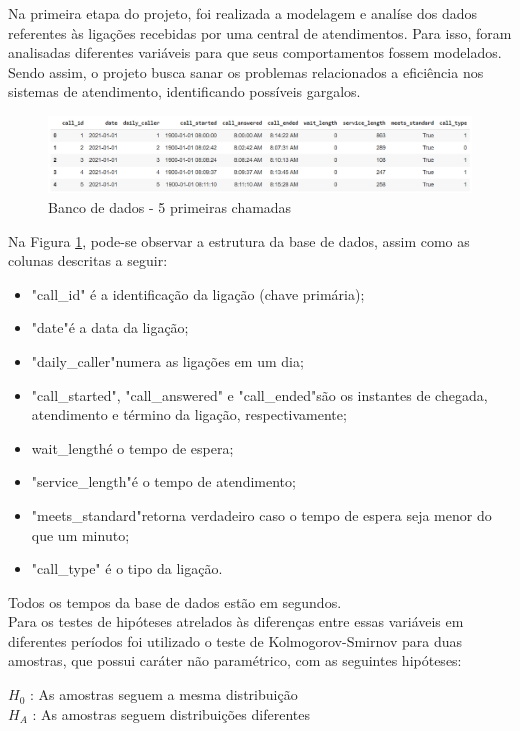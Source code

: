 Na primeira etapa do projeto, foi realizada a modelagem e analíse dos dados referentes às ligações recebidas por uma central de atendimentos. Para isso, foram analisadas diferentes variáveis para que seus comportamentos fossem modelados. Sendo assim, o projeto busca sanar os problemas relacionados a eficiência nos sistemas de atendimento, identificando possíveis gargalos.

\begin{figure}[H]
    \includegraphics[scale= 0.6]{analise-de-dados/intro-analise/imgintro.png}
    \caption{Banco de dados - 5 primeiras chamadas}
    \label{fig: bd_img}
\end{figure}

Na Figura \ref*{fig: bd_img}, pode-se observar a estrutura da base de dados, assim como as colunas descritas a seguir:

\begin{itemize} 
    \item"call\_id" é a identificação da ligação (chave primária);
    \item"date"\;é a data da ligação;
    \item "daily\_caller"\;numera as ligações em um dia;
    \item"call\_started", "call\_answered" e "call\_ended"\;são os instantes de chegada, atendimento e término  da ligação, respectivamente;
    \item wait\_length\;é o tempo de espera;
    \item"service\_length"\;é o tempo de atendimento;
    \item"meets\_standard"\;retorna verdadeiro caso o tempo de espera seja menor do que um minuto;
    \item"call\_type" é o tipo da ligação.
\end{itemize}

Todos os tempos da base de dados estão em segundos.\\
Para os testes de hipóteses atrelados às diferenças entre essas variáveis em diferentes períodos foi utilizado o teste de Kolmogorov-Smirnov para duas amostras, que possui caráter não paramétrico, com as seguintes hipóteses:\\

\begin{center}
$H_0$ : As amostras seguem a mesma distribuição\\
$H_A$ : As amostras seguem distribuições diferentes
\end{center}

